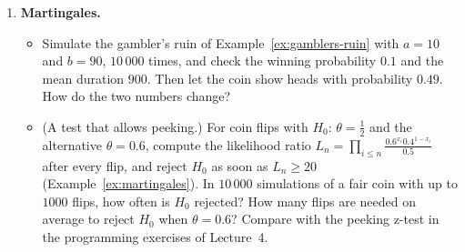 \documentclass[11pt]{article}
\theoremstyle{definition}
\theoremstyle{plain}
\theoremstyle{remark}
\begin{document}
\begin{enumerate}[label=\textbf{P\arabic*.}, leftmargin=*]
    \item \textbf{Martingales.}
    \begin{itemize}
        \item Simulate the gambler's ruin of Example~\ref{ex:gamblers-ruin} with $a = 10$ and $b = 90$, $10\,000$ times, and check the winning probability $0.1$ and the mean duration $900$. Then let the coin show heads with probability $0.49$. How do the two numbers change?
        \item (A test that allows peeking.) For coin flips with $H_0$: $\theta = \frac{1}{2}$ and the alternative $\theta = 0.6$, compute the likelihood ratio $L_n = \prod_{i \leq n}\frac{0.6^{x_i}0.4^{1 - x_i}}{0.5}$ after every flip, and reject $H_0$ as soon as $L_n \geq 20$ (Example~\ref{ex:martingales}). In $10\,000$ simulations of a fair coin with up to $1000$ flips, how often is $H_0$ rejected? How many flips are needed on average to reject $H_0$ when $\theta = 0.6$? Compare with the peeking z-test in the programming exercises of Lecture~4.
    \end{itemize}
\end{enumerate}
\end{document}
